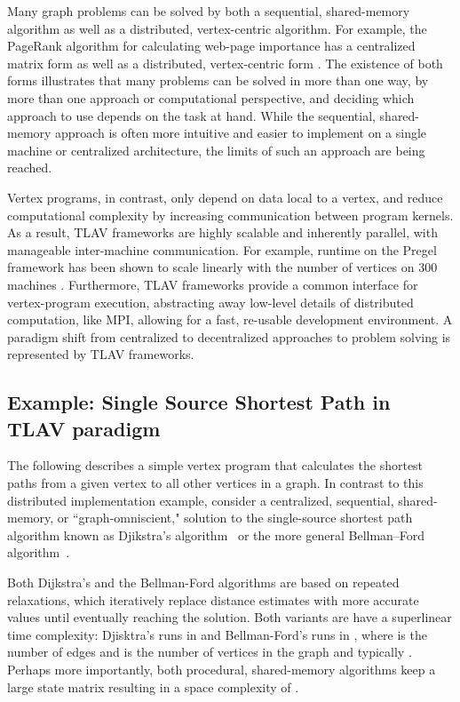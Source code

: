 \documentclass[reprint,twocolumn,showpacs,preprintnumbers,amsmath, aps,pre,amssymb]{revtex4-1}
\begin{document}
Many graph problems can be solved by both a sequential, shared-memory algorithm as well as a distributed, vertex-centric algorithm.  For example, the PageRank algorithm for calculating web-page importance has a centralized matrix form \cite{Page1999} as well as a distributed, vertex-centric form \cite{Malewicz2010}.  The existence of both forms illustrates that many problems can be solved in more than one way, by more than one approach or computational perspective, and deciding which approach to use depends on the task at hand.  While the sequential, shared-memory approach is often more intuitive and easier to implement on a single machine or centralized architecture, the limits of such an approach are being reached. 

Vertex programs, in contrast, only depend on data local to a vertex, and reduce computational complexity by increasing communication between program kernels.   As a result, TLAV frameworks are highly scalable and inherently parallel, with manageable inter-machine communication.  For example, runtime on the Pregel framework has been shown to scale linearly with the number of vertices on 300 machines \cite{Malewicz2010}.  Furthermore, TLAV frameworks provide a common interface for vertex-program execution, abstracting away low-level details of distributed computation, like MPI, allowing for a fast, re-usable development environment.  A paradigm shift from centralized to decentralized approaches to problem solving is represented by TLAV frameworks.

\subsection{Example: Single Source Shortest Path in TLAV paradigm}
\label{subsec:algo}

The following describes a simple vertex program that calculates the shortest paths from a given vertex to all other vertices in a graph. In contrast to this distributed implementation example, consider a centralized, sequential, shared-memory, or ``graph-omniscient," solution to the single-source shortest path algorithm known as Djikstra's algorithm~\cite{Dijkstra1959} or the more general Bellman–Ford algorithm~\cite{Bellman1958}.

Both Dijkstra's and the Bellman-Ford algorithms are based on repeated relaxations, which iteratively replace distance estimates with more accurate values until eventually reaching the solution. Both variants are have a superlinear time complexity: Djisktra's runs in  and Bellman-Ford's runs in , where  is the number of edges and  is the number of vertices in the graph and typically . Perhaps more importantly, both procedural, shared-memory algorithms keep a large state matrix resulting in a space complexity of .
\end{document}
